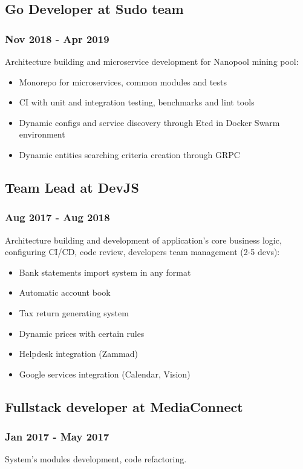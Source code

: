 \documentclass[letterpaper]{article}
\begin{document}
\subsection{Go Developer at Sudo team}
\label{sec:org825d0d2}
\subsubsection{Nov 2018 - Apr 2019}
\label{sec:orgfc80c11}
Architecture building and microservice development for Nanopool mining pool:
\begin{itemize}
\item Monorepo for microservices, common modules and tests
\item CI with unit and integration testing, benchmarks and lint tools
\item Dynamic configs and service discovery through Etcd in Docker Swarm environment
\item Dynamic entities searching criteria creation through GRPC
\end{itemize}

\subsection{Team Lead at DevJS}
\label{sec:orga8ad2a6}
\subsubsection{Aug 2017 - Aug 2018}
\label{sec:orgb93c34a}
Architecture building and development of application's core business logic, configuring CI/CD, code review, developers team management (2-5 devs):
\begin{itemize}
\item Bank statements import system in any format
\item Automatic account book
\item Tax return generating system
\item Dynamic prices with certain rules
\item Helpdesk integration (Zammad)
\item Google services integration (Calendar, Vision)
\end{itemize}

\subsection{Fullstack developer at MediaConnect}
\label{sec:org03d9477}
\subsubsection{Jan 2017 - May 2017}
\label{sec:org5f32ebe}
System's modules development, code refactoring.
\end{document}
